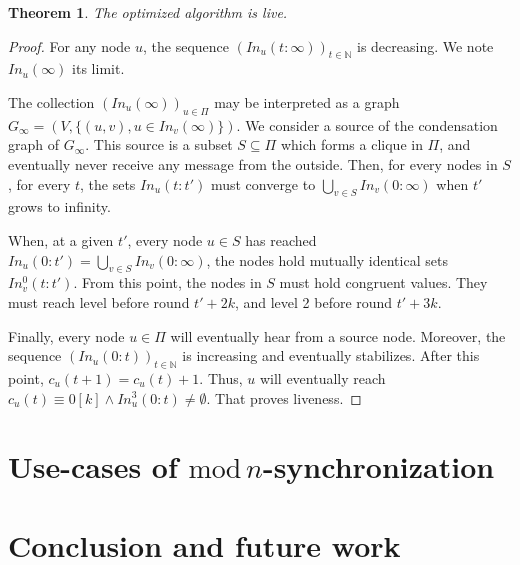 \documentclass[11pt,letterpaper]{article}
\newtheorem{thm}{Theorem}
\begin{document}
\begin{thm}
	The optimized algorithm is live.
\end{thm}
\begin{proof}
	For any node $u$, the sequence $(In_u(t:\infty))_{t \in \mathds{N}}$ is decreasing.
	We note $In_u(\infty)$ its limit.

	The collection $(In_u(\infty))_{u \in \Pi}$ may be interpreted as a graph $G_\infty = (V, \{(u,v), u \in In_v(\infty)\})$.
	We consider a source of the condensation graph of $G_\infty$.
	This source is a subset $S \subseteq \Pi$ which forms a clique in $\Pi$, and eventually never receive any message from the outside.
	Then, for every nodes in $S$, for every $t$, the sets $In_u(t:t')$ must converge to $\bigcup\limits_{v \in S} In_v(0:\infty)$ when $t'$ grows to infinity.

	When, at a given $t'$, every node $u \in S$ has reached $In_u(0:t') = \bigcup\limits_{v \in S} In_v(0:\infty)$, the nodes hold mutually identical sets $In_v^0(t:t')$.
	From this point, the nodes in $S$ must hold congruent values.
	They must reach level before round $t'+2k$, and level 2 before round $t'+3k$.

	Finally, every node $u \in \Pi$ will eventually hear from a source node.
	Moreover, the sequence $(In_u(0:t))_{t \in \mathds{N}}$ is increasing and eventually stabilizes.
	After this point, $c_u(t+1) = c_u(t)+1$.
	Thus, $u$ will eventually reach $c_u(t) \equiv 0 [k] \wedge In_u^3(0:t) \neq \emptyset$.
	That proves liveness.
\end{proof}

\section{Use-cases of $\mathrm{mod}\,n$-synchronization}

\section{Conclusion and future work}


\printbibliography
\end{document}
